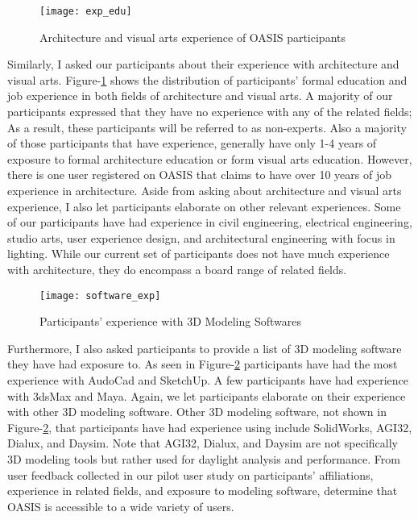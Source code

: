 \begin{figure}[h]
	\centering
	\texttt{[image: exp\_edu]}
	\caption{Architecture and visual arts experience of OASIS participants }
	\label{fig:exp_edu}
\end{figure}

Similarly, I asked our participants about their experience with architecture and visual arts.
Figure-\ref{fig:exp_edu} shows the distribution of participants' formal education and job experience in both fields of architecture and visual arts.
A majority of our participants expressed that they have no experience with any of the related fields;
As a result, these participants will be referred to as non-experts.
Also a majority of those participants that have experience, generally have only 1-4 years of exposure to formal architecture education or form visual arts education.
However, there is one user registered on OASIS that claims to have over 10 years of job experience in architecture.
Aside from asking about architecture and visual arts experience, I also let participants elaborate on other relevant experiences. 
Some of our participants have had experience in civil engineering, electrical engineering, studio arts, user experience design, and architectural engineering with focus in lighting.
While our current set of participants does not have much experience with architecture, they do encompass a board range of related fields.\\

\begin{figure}[h]
	\centering
	\texttt{[image: software\_exp]}
	\caption{Participants' experience with 3D Modeling Softwares}
	\label{fig:software_exp}
\end{figure}


Furthermore, I also asked participants to provide a list of 3D modeling software they have had exposure to.
As seen in Figure-\ref{fig:software_exp} participants have had the most experience with AudoCad\cite{} and SketchUp\cite{}. 
A few participants have had experience with 3dsMax\cite{} and Maya\cite{}.
Again, we let participants elaborate on their experience with other 3D modeling software. 
Other 3D modeling software, not shown in Figure-\ref{fig:software_exp}, that participants have had experience using include SolidWorks\cite{}, AGI32\cite{}, Dialux\cite{}, and Daysim\cite{}.
Note that AGI32, Dialux, and Daysim are not specifically 3D modeling tools but rather used for daylight analysis and performance.
From user feedback collected in our pilot user study on participants' affiliations, experience in related fields, and exposure to modeling software, determine that OASIS is accessible to a wide variety of users. \\

